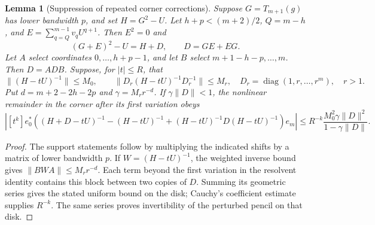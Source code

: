 \documentclass[11pt]{article}
\newtheorem{lemma}[proposition]{Lemma}
\begin{document}
\begin{lemma}[Suppression of repeated corner corrections]
\label{lem:corner-feedback}
Suppose $G=T_{m+1}(g)$ has lower bandwidth $p$, and set $H=G^2-U$.
Let $h+p<(m+2)/2$, $Q=m-h$, and
$E=\sum_{q=Q}^{m-1}v_qU^{q+1}$. Then $E^2=0$ and
\[
 (G+E)^2-U=H+D,\qquad D=GE+EG.
\]
Let $A$ select coordinates $0,\ldots,h+p-1$, and let $B$ select
$m+1-h-p,\ldots,m$. Then $D=ADB$.
Suppose, for $|t|\le R$, that
\[
 \|(H-tU)^{-1}\|\le M_0,\qquad
 \|D_r(H-tU)^{-1}D_r^{-1}\|\le M_r,
 \quad D_r=\operatorname{diag}(1,r,\ldots,r^m),\quad r>1.
\]
Put $d=m+2-2h-2p$ and $\gamma=M_rr^{-d}$. If $\gamma\|D\|<1$,
the nonlinear remainder in the corner after its first variation obeys
\[
 \left|[t^k]e_0^*\left((H+D-tU)^{-1}-(H-tU)^{-1}
       +(H-tU)^{-1}D(H-tU)^{-1}\right)e_m\right|
 \le R^{-k}\frac{M_0^2\gamma\|D\|^2}{1-\gamma\|D\|}.
\]
\end{lemma}
\begin{proof}
The support statements follow by multiplying the indicated shifts by a
matrix of lower bandwidth $p$. If $W=(H-tU)^{-1}$, the weighted inverse
bound gives $\|BWA\|\le M_rr^{-d}$. Each term beyond the first variation
in the resolvent identity contains this block between two copies of $D$.
Summing its geometric series gives the stated uniform bound on the disk;
Cauchy's coefficient estimate supplies $R^{-k}$. The same series proves
invertibility of the perturbed pencil on that disk.
\end{proof}
\end{document}
